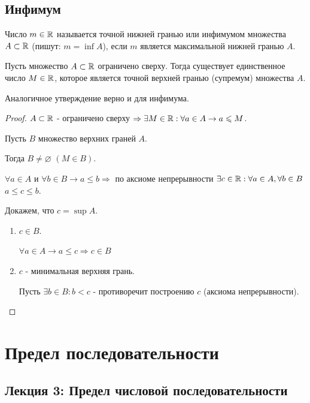 	\section{Инфимум}
	
	\begin{definition}
		Число $m \in \mathbb R$ называется точной нижней гранью или инфимумом множества $A \subset \mathbb R$ (пишут: $m = \inf{A}$), если $m$	является максимальной нижней гранью $A$.
	\end{definition}
	
	\begin{theorem}
		Пусть множество $A \subset \mathbb R$ ограничено сверху. Тогда существует
		единственное число $M \in \mathbb R$, которое является точной верхней гранью (супремум) множества $A$.
	\end{theorem}
	
	Аналогичное утверждение верно и для инфимума.
	
	\begin{proof}
		$A \subset \mathbb R$ - ограничено сверху $\Rightarrow \exists M \in \mathbb R : \forall a \in A \rightarrow a \leqslant M$.
		
		Пусть $B$ множество верхних граней $A$.
		
		Тогда $B \neq \varnothing$ $(M \in B)$.
		
		$\forall a \in A$ и $\forall b \in B \rightarrow a \leqslant b \Rightarrow$ по аксиоме непрерывности $\exists c \in \mathbb R : \forall a \in A, \forall b \in B$ $a \leqslant c \leqslant b$.
		
		Докажем, что $c = \sup{A}$.
		\begin{enumerate}
			\item $c \in B$.
			
			$\forall a \in A \rightarrow a \leqslant c \Rightarrow c \in B$
			
			\item $c$ - минимальная верхняя грань.
			
			Пусть $\exists b \in B : b < c$ - противоречит построению $c$ (аксиома непрерывности).
		\end{enumerate}
	\end{proof}
	
	\newpage
	
	\chapter{Предел последовательности}
	
	\section*{Лекция 3: Предел числовой последовательности}
	
